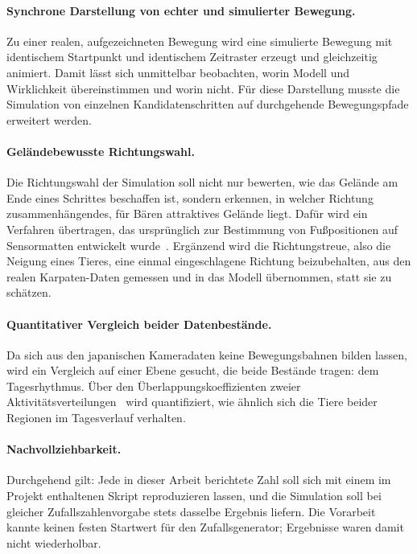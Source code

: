 \documentclass[12pt,a4paper]{scrreprt}
\begin{document}
\paragraph{Synchrone Darstellung von echter und simulierter Bewegung.}
Zu einer realen, aufgezeichneten Bewegung wird eine simulierte Bewegung
mit identischem Startpunkt und identischem Zeitraster erzeugt und
gleichzeitig animiert. Damit lässt sich unmittelbar beobachten, worin
Modell und Wirklichkeit übereinstimmen und worin nicht. Für diese
Darstellung musste die Simulation von einzelnen Kandidatenschritten auf
durchgehende Bewegungspfade erweitert werden.

\paragraph{Geländebewusste Richtungswahl.}
Die Richtungswahl der Simulation soll nicht nur bewerten, wie das
Gelände am Ende eines Schrittes beschaffen ist, sondern erkennen, in
welcher Richtung zusammenhängendes, für Bären attraktives Gelände
liegt. Dafür wird ein Verfahren übertragen, das ursprünglich zur
Bestimmung von Fußpositionen auf Sensormatten entwickelt
wurde~\cite{geyer2026}. Ergänzend wird die Richtungstreue, also die
Neigung eines Tieres, eine einmal eingeschlagene Richtung
beizubehalten, aus den realen Karpaten-Daten gemessen und in das Modell
übernommen, statt sie zu schätzen.

\paragraph{Quantitativer Vergleich beider Datenbestände.}
Da sich aus den japanischen Kameradaten keine Bewegungsbahnen bilden
lassen, wird ein Vergleich auf einer Ebene gesucht, die beide Bestände
tragen: dem Tagesrhythmus. Über den Überlappungskoeffizienten zweier
Aktivitätsverteilungen~\cite{ridout2009} wird quantifiziert, wie
ähnlich sich die Tiere beider Regionen im Tagesverlauf verhalten.

\paragraph{Nachvollziehbarkeit.}
Durchgehend gilt: Jede in dieser Arbeit berichtete Zahl soll sich mit
einem im Projekt enthaltenen Skript reproduzieren lassen, und die
Simulation soll bei gleicher Zufallszahlenvorgabe stets dasselbe
Ergebnis liefern. Die Vorarbeit kannte keinen festen Startwert für den
Zufallsgenerator; Ergebnisse waren damit nicht wiederholbar.
\end{document}
